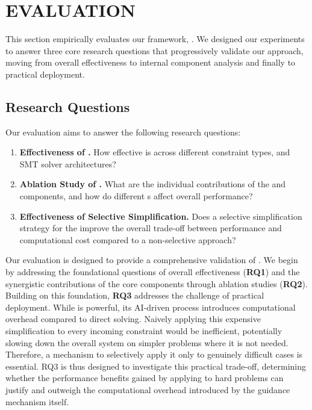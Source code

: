 \section{EVALUATION}
\label{sec:evaluation}
This section empirically evaluates our framework, \tool{}. We designed our experiments to answer three core research questions that progressively validate our approach, moving from overall effectiveness to internal component analysis and finally to practical deployment.

\subsection{Research Questions}
Our evaluation aims to answer the following research questions:
\begin{enumerate}[leftmargin=*,label=\textbf{RQ\arabic*.},wide, labelwidth=!, labelindent=0pt]
    \item \textbf{Effectiveness of \tool{}.} How effective is \tool{} across different constraint types, and SMT solver architectures?

    \item \textbf{Ablation Study of \tool{}.} What are the individual contributions of the \RL{} and \LLM{} components, and how do different \LLM{}s affect overall performance?
    
    \item \textbf{Effectiveness of Selective Simplification.} Does a selective simplification strategy for the \tool{} improve the overall trade-off between performance and computational cost compared to a non-selective approach?
\end{enumerate}

Our evaluation is designed to provide a comprehensive validation of \tool{}. We begin by addressing the foundational questions of overall effectiveness (\textbf{RQ1}) and the synergistic contributions of the core components through ablation studies (\textbf{RQ2}). Building on this foundation, \textbf{RQ3} addresses the challenge of practical deployment. While \tool{} is powerful, its AI-driven process introduces computational overhead compared to direct solving. Naively applying this expensive simplification to every incoming constraint would be inefficient, potentially slowing down the overall system on simpler problems where it is not needed. Therefore, a mechanism to selectively apply it only to genuinely difficult cases is essential. RQ3 is thus designed to investigate this practical trade-off, determining whether the performance benefits gained by applying \tool{} to hard problems can justify and outweigh the computational overhead introduced by the guidance mechanism itself.




